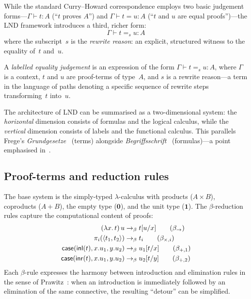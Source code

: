 \documentclass[manuscript]{BSLstyle}
\begin{document}
While the standard Curry--Howard correspondence employs two basic
judgement forms---$\Gamma \vdash t : A$ (``$t$ proves $A$'') and
$\Gamma \vdash t = u : A$ (``$t$ and $u$ are equal proofs'')---the LND
framework introduces a third, richer form:
\begin{equation}\label{eq:labelled-equality}
\Gamma \vdash t =_s u : A
\end{equation}
where the subscript~$s$ is the \emph{rewrite reason}: an explicit,
structured witness to the equality of~$t$ and~$u$.

\begin{definition}\label{def:labelled-eq}
A \emph{labelled equality judgement} is an expression of the form
$\Gamma \vdash t =_s u : A$, where $\Gamma$ is a context, $t$ and $u$
are proof-terms of type~$A$, and $s$ is a rewrite reason---a term in
the language of paths denoting a specific sequence of rewrite steps
transforming~$t$ into~$u$.
\end{definition}

The architecture of LND can be summarised as a two-dimensional system:
the \emph{horizontal} dimension consists of formulas and the logical
calculus, while the \emph{vertical} dimension consists of labels and the
functional calculus.  This parallels Frege's
\emph{Grundgesetze}~\cite{Frege93:GrundI} (terms) alongside
\emph{Begriffsschrift}~\cite{Frege79:Begr} (formulas)---a point
emphasised in~\cite{deQueiroz92:wittgenstein15}.

\subsection{Proof-terms and reduction rules}

The base system is the simply-typed $\lambda$-calculus with products
($A \times B$), coproducts ($A + B$), the empty type ($\mathbf{0}$), and
the unit type ($\mathbf{1}$).  The $\beta$-reduction rules capture the
computational content of proofs:
\begin{align}
(\lambda x.\, t)\, u &\to_\beta t[u/x] \tag{$\beta_\to$} \\
\pi_i(\langle t_1, t_2 \rangle) &\to_\beta t_i \tag{$\beta_{\times,i}$} \\
\mathsf{case}(\mathsf{inl}(t), x.u_1, y.u_2) &\to_\beta u_1[t/x]
  \tag{$\beta_{+,1}$} \\
\mathsf{case}(\mathsf{inr}(t), x.u_1, y.u_2) &\to_\beta u_2[t/y]
  \tag{$\beta_{+,2}$}
\end{align}
Each $\beta$-rule expresses the harmony between introduction and
elimination rules in the sense of Prawitz~\cite{Prawitz65}: when an
introduction is immediately followed by an elimination of the same
connective, the resulting ``detour'' can be simplified.
\end{document}
